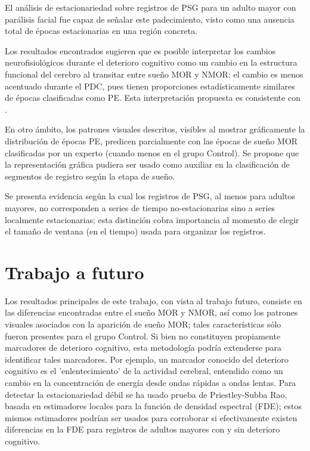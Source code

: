 El análisis de estacionariedad sobre registros de PSG para un adulto mayor con parálisis facial 
fue capaz de señalar este padecimiento, visto como una ausencia total de épocas estacionarias
en una región concreta.

Los resultados encontrados sugieren que es posible interpretar los cambios neurofisiológicos 
durante el deterioro cognitivo como un cambio en la estructura funcional del cerebro al transitar 
entre sueño MOR y NMOR: el cambio es menos acentuado durante el PDC, pues tienen proporciones 
estadísticamente similares de épocas clasificadas como PE.
Esta interpretación propuesta es consistente con \cite{Valeria}.

En otro ámbito, los patrones visuales descritos, visibles al mostrar gráficamente la 
distribución de épocas PE, predicen parcialmente con las épocas de sueño MOR clasificadas 
por un experto (cuando menos en el grupo Control).
Se propone que la representación gráfica pudiera ser usado como auxiliar en la clasificación 
de segmentos de registro según la etapa de sueño.

Se presenta evidencia según la cual los registros de PSG, al menos para adultos mayores, no 
corresponden a series de tiempo no-estacionarias sino a series localmente estacionarias; esta 
distinción cobra importancia al momento de elegir el tamaño de ventana (en el tiempo) usada 
para organizar los registros.


\section{Trabajo a futuro}

Los resultados principales de este trabajo, con vista al trabajo futuro, consiste en las 
diferencias encontradas entre el sueño MOR y NMOR, así como los patrones visuales asociados con 
la aparición de sueño MOR; tales características sólo fueron presentes para el grupo 
Control. Si bien no constituyen propiamente marcadores de deterioro cognitivo, esta metodología
podría extenderse para identificar tales marcadores.
Por ejemplo, un marcador conocido \cite{Becerra12} del deterioro cognitivo es el 'enlentecimiento' 
de la actividad cerebral, entendido como un cambio en la concentración de energía desde ondas 
rápidas a ondas lentas.
Para detectar la estacionariedad débil se ha usado prueba de Priestley-Subba Rao, basada en 
estimadores locales para la función de densidad espectral (FDE); estos mismos estimadores 
podrían ser usados para corroborar si efectivamente existen diferencias en la FDE para registros 
de adultos mayores con y sin deterioro cognitivo. 


